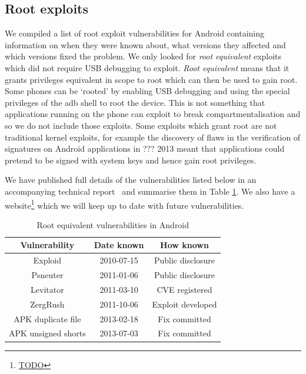 \documentclass[conference,a4paper,twoside]{IEEEtran}
\begin{document}
\subsection{Root exploits}
We compiled a list of root exploit vulnerabilities for Android containing information on when they were known about, what versions they affected and which versions fixed the problem.
We only looked for \emph{root equivalent} exploits which did not require USB debugging to exploit.
\emph{Root equivalent} means that it grants privileges equivalent in scope to root which can then be used to gain root.
Some phones can be `rooted' by enabling USB debugging and using the special privileges of the adb shell to root the device.
This is not something that applications running on the phone can exploit to break compartmentalisation and so we do not include those exploits.
Some exploits which grant root are not traditional kernel exploits, for example the discovery of flaws in the verification of signatures on Android applications in ??? 2013 meant that applications could pretend to be signed with system keys and hence gain root privileges.

We have published full details of the vulnerabilities listed below in an accompanying technical report~\cite{TODO} and summarise them in Table \ref{tab:andvulns}.
We also have a website\footnote{\url{TODO}} which we will keep up to date with future vulnerabilities.

\begin{table}
\centering
\begin{tabular}{c|c|c}
Vulnerability & Date known & How known \\
\hline
Exploid & 2010-07-15 & Public disclosure \\
Psneuter & 2011-01-06 & Public disclosure \\
Levitator & 2011-03-10 & CVE registered \\
ZergRush & 2011-10-06 & Exploit developed \\
APK duplicate file & 2013-02-18 & Fix committed \\
APK unsigned shorts & 2013-07-03 & Fix committed \\
\end{tabular}
\caption{Root equivalent vulnerabilities in Android}
\label{tab:andvulns}
\end{table}
\end{document}
